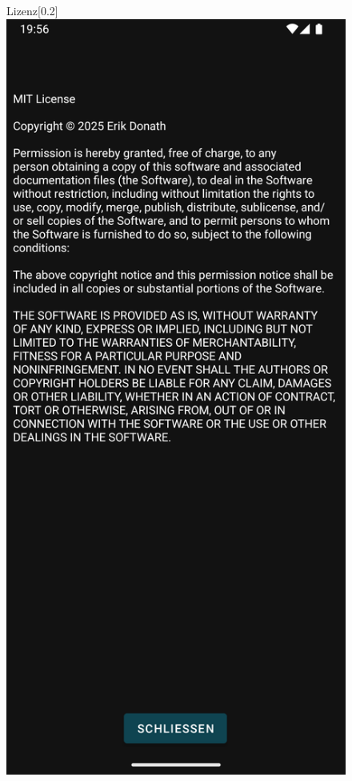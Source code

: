 \documentclass[12pt,a4paper]{article}
\begin{document}
\begin{figure}[h]
    \centering
    \begin{subcaptionbox}{Lizenz\label{fig:bild1}}[0.2\linewidth]
        {\includegraphics[width=\linewidth]{showcase/License.png}}

\end{subcaptionbox}
\end{figure}
\end{document}
